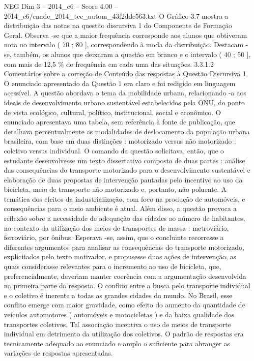 \begin{textsample}{NEG Dim 3 – 2014\_c6 – Score 4.00 – 2014\_c6/enade\_2014\_tec\_autom\_43f2ddc563.txt}
O Gráfico 3.7 mostra a distribuição das notas na questão discursiva 1 do Componente de Formação Geral.
Observa -se que a maior frequência corresponde aos alunos que obtiveram nota no intervalo ( 70 ; 80 ], correspondendo à moda da distribuição.
Destacam -se, também, os alunos que deixaram a questão em branco e o intervalo ( 40 ; 50 ], com mais de 12,5 \% de frequência em cada uma das situações. 3.3.1.2 Comentários sobre a correção de Conteúdo das respostas à Questão Discursiva 1 O enunciado apresentado da Questão 1 era claro e foi redigido em linguagem acessível.
A questão abordava o tema da mobilidade urbana, relacionando -a aos ideais de desenvolvimento urbano sustentável estabelecidos pela ONU, do ponto de vista ecológico, cultural, político, institucional, social e econômico.
O enunciado apresentava uma tabela, sem referência à fonte de publicação, que detalhava percentualmente as modalidades de deslocamento da população urbana brasileira, com base em duas distinções : motorizado versus não motorizado ; coletivo versus individual.
O comando da questão solicitava, então, que o estudante desenvolvesse um texto dissertativo composto de duas partes : análise das consequências do transporte motorizado para o desenvolvimento sustentável e elaboração de duas propostas de intervenção pautadas pelo incentivo ao uso da bicicleta, meio de transporte não motorizado e, portanto, não poluente.
A temática dos efeitos da industrialização, com foco na produção de automóveis, e consequências para o meio ambiente é atual.
Além disso, a questão provoca a reflexão sobre a necessidade de adequação das cidades ao número de habitantes, no contexto da utilização dos meios de transportes de massa : metroviário, ferroviário, por ônibus.
Esperava -se, assim, que o concluinte recorresse a diferentes argumentos para analisar as consequências do transporte motorizado, explicitados pelo texto motivador, e propusesse duas ações de intervenção, as quais considerasse relevantes para o incremento ao uso de bicicleta, que, preferencialmente, deveriam manter coerência com a argumentação desenvolvida na primeira parte da resposta.
O conflito entre a busca pelo transporte individual e o coletivo é inerente a todas as grandes cidades do mundo.
No Brasil, esse conflito emerge com maior gravidade, como efeito do aumento da quantidade de veículos automotores ( automóveis e motocicletas ) e da baixa qualidade dos transportes coletivos.
Tal associação incentiva o uso de meios de transporte individual em detrimento da utilização dos coletivos.
O padrão de respostas era tecnicamente adequado ao enunciado e amplo o suficiente para abranger as variações de respostas apresentadas.

\end{textsample}
